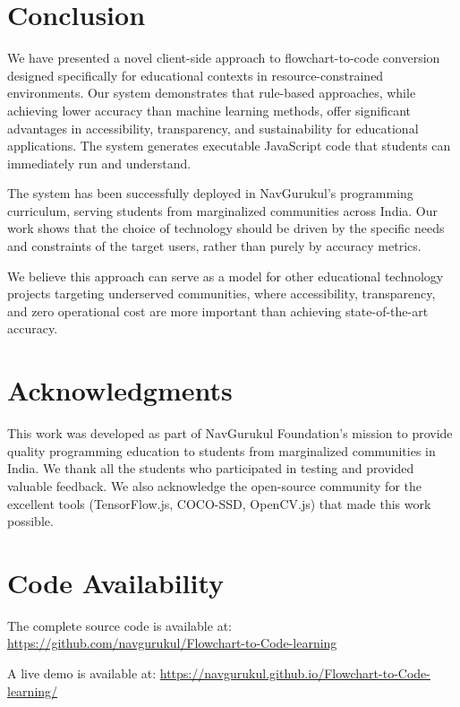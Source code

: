\documentclass[11pt,a4paper]{article}
\begin{document}
\section{Conclusion}

We have presented a novel client-side approach to flowchart-to-code conversion designed specifically for educational contexts in resource-constrained environments. Our system demonstrates that rule-based approaches, while achieving lower accuracy than machine learning methods, offer significant advantages in accessibility, transparency, and sustainability for educational applications. The system generates executable JavaScript code that students can immediately run and understand.

The system has been successfully deployed in NavGurukul's programming curriculum, serving students from marginalized communities across India. Our work shows that the choice of technology should be driven by the specific needs and constraints of the target users, rather than purely by accuracy metrics.

We believe this approach can serve as a model for other educational technology projects targeting underserved communities, where accessibility, transparency, and zero operational cost are more important than achieving state-of-the-art accuracy.

\section*{Acknowledgments}

This work was developed as part of NavGurukul Foundation's mission to provide quality programming education to students from marginalized communities in India. We thank all the students who participated in testing and provided valuable feedback. We also acknowledge the open-source community for the excellent tools (TensorFlow.js, COCO-SSD, OpenCV.js) that made this work possible.

\section*{Code Availability}

The complete source code is available at: \url{https://github.com/navgurukul/Flowchart-to-Code-learning}

A live demo is available at: \url{https://navgurukul.github.io/Flowchart-to-Code-learning/}
\end{document}
